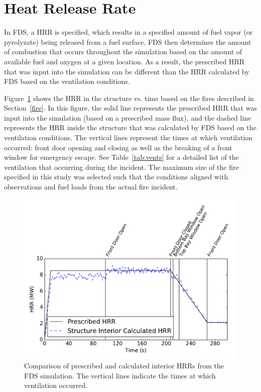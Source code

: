 \documentclass[12pt,oneside]{book}
\begin{document}
\clearpage

\section{Heat Release Rate}
\label{HRR}
In FDS, a HRR is specified, which results in a specified amount of fuel vapor (or pyrolyzate) being released from a fuel surface. FDS then determines the amount of combustion that occurs throughout the simulation based on the amount of available fuel and oxygen at a given location. As a result, the prescribed HRR that was input into the simulation can be different than the HRR calculated by FDS based on the ventilation conditions.

Figure~\ref{fig:PG_Total_HRR} shows the HRR in the structure vs. time based on the fires described in Section~\ref{fire}. In this figure, the solid line represents the prescribed HRR that was input into the simulation (based on a prescribed mass flux), and the dashed line represents the HRR inside the structure that was calculated by FDS based on the ventilation conditions. The vertical lines represent the times at which ventilation occurred: front door opening and closing as well as the breaking of a front window for emergency escape. See Table~\ref{tab:vents} for a detailed list of the ventilation that occurring during the incident. The maximum size of the fire specified in this study was selected such that the conditions aligned with observations and fuel loads from the actual fire incident. 

\begin{figure}[!ht]
\includegraphics[width=5in]{../Figures/PG_Total_9MW_HRR}
\caption[Interior prescribed and calculated interior HRRs vs. time from the simulation.]
{Comparison of prescribed and calculated interior HRRs from the FDS simulation. The vertical lines indicate the times at which ventilation occurred.}
\label{fig:PG_Total_HRR}
\end{figure}
\end{document}
